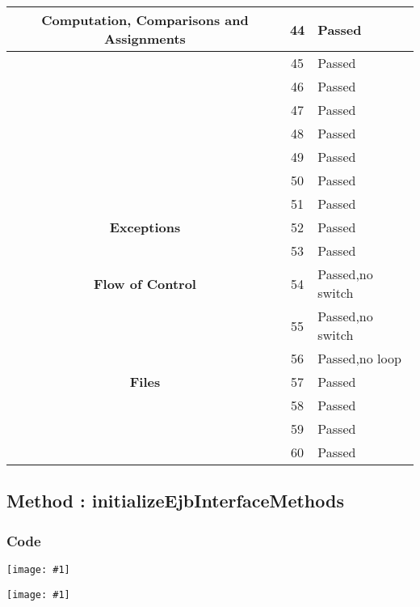 \documentclass[11pt, a4paper,titlepage]{article}
\newcommand{\image}[1]{
	\begin{center}
		\noindent \texttt{[image: \#1]}
	\end{center}
	}
\begin{document}
 \begin{tabularx}{\textwidth}{| c |c |X |}
 	\hline \textbf{Computation, Comparisons and Assignments} & 44 & Passed \\
 	\hline  & 45 & Passed \\
 	\hline  & 46 & Passed \\
 	\hline  & 47 & Passed \\
 	\hline  & 48 & Passed \\
 	\hline  & 49 & Passed \\
 	\hline  & 50 & Passed \\
 	\hline  & 51 & Passed \\
 	\hline \textbf{Exceptions} & 52 & Passed \\
 	\hline  & 53 & Passed \\
 	\hline \textbf{Flow of Control} & 54 & Passed,no switch \\
 	\hline  & 55 & Passed,no switch \\
 	\hline  & 56 & Passed,no loop \\
 	\hline \textbf{Files} & 57 & Passed \\
 	\hline  & 58 & Passed \\
 	\hline  & 59 & Passed \\
 	\hline  & 60 & Passed \\
 	\hline
 \end{tabularx}
\newpage
\subsection{Method : initializeEjbInterfaceMethods }
\subsubsection{Code}
\image{code_31.png}
\image{code_32.png}
\newpage
\end{document}
